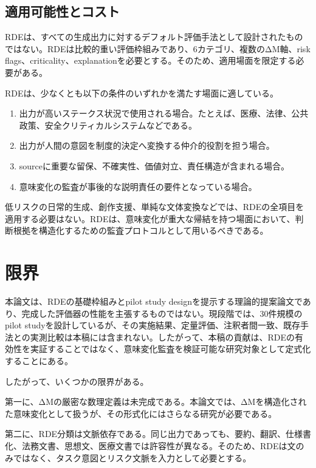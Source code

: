 \documentclass[
  a4paper]{ltjsarticle}
\providecommand{\tightlist}{%
  \setlength{\itemsep}{0pt}\setlength{\parskip}{0pt}}
\begin{document}
\subsection{適用可能性とコスト}\label{applicability-and-cost}

RDEは、すべての生成出力に対するデフォルト評価手法として設計されたものではない。RDEは比較的重い評価枠組みであり、6カテゴリ、複数のΔM軸、risk
flags、criticality、explanationを必要とする。そのため、適用場面を限定する必要がある。

RDEは、少なくとも以下の条件のいずれかを満たす場面に適している。

\begin{enumerate}
\def\labelenumi{\arabic{enumi}.}
\tightlist
\item
  出力が高いステークス状況で使用される場合。たとえば、医療、法律、公共政策、安全クリティカルシステムなどである。
\item
  出力が人間の意図を制度的決定へ変換する仲介的役割を担う場合。
\item
  sourceに重要な留保、不確実性、価値対立、責任構造が含まれる場合。
\item
  意味変化の監査が事後的な説明責任の要件となっている場合。
\end{enumerate}

低リスクの日常的生成、創作支援、単純な文体変換などでは、RDEの全項目を適用する必要はない。RDEは、意味変化が重大な帰結を持つ場面において、判断根拠を構造化するための監査プロトコルとして用いるべきである。

\section{限界}\label{limitations}

本論文は、RDEの基礎枠組みとpilot study
designを提示する理論的提案論文であり、完成した評価器の性能を主張するものではない。現段階では、30件規模のpilot
studyを設計しているが、その実施結果、定量評価、注釈者間一致、既存手法との実測比較は本稿には含まれない。したがって、本稿の貢献は、RDEの有効性を実証することではなく、意味変化監査を検証可能な研究対象として定式化することにある。

したがって、いくつかの限界がある。

第一に、ΔMの厳密な数理定義は未完成である。本論文では、ΔMを構造化された意味変化として扱うが、その形式化にはさらなる研究が必要である。

第二に、RDE分類は文脈依存である。同じ出力であっても、要約、翻訳、仕様書化、法務文書、思想文、医療文書では許容性が異なる。そのため、RDEは文のみではなく、タスク意図とリスク文脈を入力として必要とする。
\end{document}
